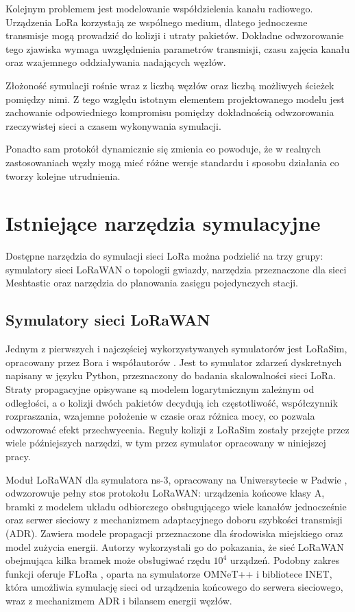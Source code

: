 \documentclass[12pt,a4paper,twoside]{report}
\theoremstyle{definition} %
\begin{document}
Kolejnym problemem jest modelowanie współdzielenia kanału radiowego. Urządzenia LoRa korzystają ze wspólnego medium, dlatego jednoczesne transmisje mogą prowadzić do kolizji i utraty pakietów. Dokładne odwzorowanie tego zjawiska wymaga uwzględnienia parametrów transmisji, czasu zajęcia kanału oraz wzajemnego oddziaływania nadających węzłów.

Złożoność symulacji rośnie wraz z liczbą węzłów oraz liczbą możliwych ścieżek pomiędzy nimi. Z tego względu istotnym elementem projektowanego modelu jest zachowanie odpowiedniego kompromisu pomiędzy dokładnością odwzorowania rzeczywistej sieci a czasem wykonywania symulacji.

Ponadto sam protokół dynamicznie się zmienia co powoduje, że w realnych zastosowaniach węzły mogą mieć różne wersje standardu i sposobu działania co tworzy kolejne utrudnienia.

\section{Istniejące narzędzia symulacyjne}

Dostępne narzędzia do symulacji sieci LoRa można podzielić na trzy grupy: symulatory sieci LoRaWAN o topologii gwiazdy, narzędzia przeznaczone dla sieci Meshtastic oraz narzędzia do planowania zasięgu pojedynczych stacji.

\subsection{Symulatory sieci LoRaWAN}

Jednym z pierwszych i najczęściej wykorzystywanych symulatorów jest LoRaSim, opracowany przez Bora i współautorów \cite{bor2016}. Jest to symulator zdarzeń dyskretnych napisany w języku Python, przeznaczony do badania skalowalności sieci LoRa. Straty propagacyjne opisywane są modelem logarytmicznym zależnym od odległości, a o kolizji dwóch pakietów decydują ich częstotliwość, współczynnik rozpraszania, wzajemne położenie w czasie oraz różnica mocy, co pozwala odwzorować efekt przechwycenia. Reguły kolizji z LoRaSim zostały przejęte przez wiele późniejszych narzędzi, w tym przez symulator opracowany w niniejszej pracy.

Moduł LoRaWAN dla symulatora ns-3, opracowany na Uniwersytecie w Padwie \cite{magrin2017}, odwzorowuje pełny stos protokołu LoRaWAN: urządzenia końcowe klasy A, bramki z modelem układu odbiorczego obsługującego wiele kanałów jednocześnie oraz serwer sieciowy z mechanizmem adaptacyjnego doboru szybkości transmisji (ADR). Zawiera modele propagacji przeznaczone dla środowiska miejskiego oraz model zużycia energii. Autorzy wykorzystali go do pokazania, że sieć LoRaWAN obejmująca kilka bramek może obsługiwać rzędu \(10^4\) urządzeń. Podobny zakres funkcji oferuje FLoRa \cite{slabicki2018}, oparta na symulatorze OMNeT++ i bibliotece INET, która umożliwia symulację sieci od urządzenia końcowego do serwera sieciowego, wraz z mechanizmem ADR i bilansem energii węzłów.
\end{document}
